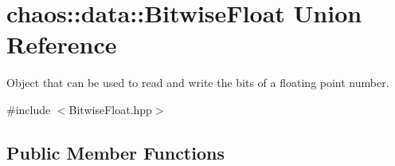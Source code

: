 \hypertarget{unionchaos_1_1data_1_1_bitwise_float}{}\section{chaos\+:\+:data\+:\+:Bitwise\+Float Union Reference}
\label{unionchaos_1_1data_1_1_bitwise_float}


Object that can be used to read and write the bits of a floating point number.  




{\ttfamily \#include $<$Bitwise\+Float.\+hpp$>$}

\subsection*{Public Member Functions}
